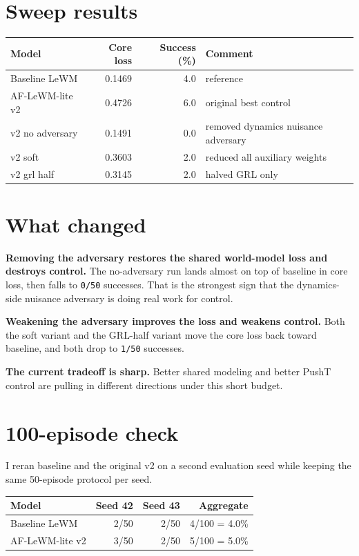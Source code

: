 \documentclass[11pt]{article}
\begin{document}
\section*{Sweep results}
\begin{center}
\small
\begin{tabular}{lrrl}
\toprule
Model & Core loss & Success (\%) & Comment \\
\midrule
Baseline LeWM & 0.1469 & 4.0 & reference \\
AF-LeWM-lite v2 & 0.4726 & 6.0 & original best control \\
v2 no adversary & 0.1491 & 0.0 & removed dynamics nuisance adversary \\
v2 soft & 0.3603 & 2.0 & reduced all auxiliary weights \\
v2 grl half & 0.3145 & 2.0 & halved GRL only \\
\bottomrule
\end{tabular}
\end{center}

\section*{What changed}
\textbf{Removing the adversary restores the shared world-model loss and destroys control.} The no-adversary run lands almost on top of baseline in core loss, then falls to \texttt{0/50} successes. That is the strongest sign that the dynamics-side nuisance adversary is doing real work for control.

\textbf{Weakening the adversary improves the loss and weakens control.} Both the soft variant and the GRL-half variant move the core loss back toward baseline, and both drop to \texttt{1/50} successes.

\textbf{The current tradeoff is sharp.} Better shared modeling and better PushT control are pulling in different directions under this short budget.

\section*{100-episode check}
I reran baseline and the original v2 on a second evaluation seed while keeping the same 50-episode protocol per seed.

\begin{center}
\small
\begin{tabular}{lrrr}
\toprule
Model & Seed 42 & Seed 43 & Aggregate \\
\midrule
Baseline LeWM & 2/50 & 2/50 & 4/100 = 4.0\% \\
AF-LeWM-lite v2 & 3/50 & 2/50 & 5/100 = 5.0\% \\
\bottomrule
\end{tabular}
\end{center}
\end{document}

